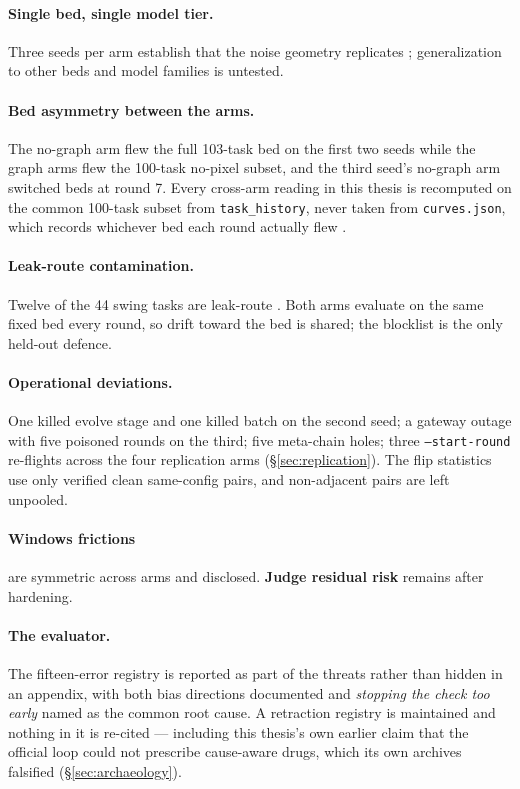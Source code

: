 \paragraph{Single bed, single model tier.} Three seeds per arm establish
that the noise geometry replicates ; generalization to other
beds and model families is untested.

\paragraph{Bed asymmetry between the arms.} The no-graph arm flew the full
103-task bed on the first two seeds while the graph arms flew the 100-task
no-pixel subset, and the third seed's no-graph arm switched beds at round 7.
Every cross-arm reading in this thesis is recomputed on the common 100-task
subset from \texttt{task\_history}, never taken from \texttt{curves.json},
which records whichever bed each round actually flew .

\paragraph{Leak-route contamination.} Twelve of the 44 swing tasks are
leak-route . Both arms evaluate on the same fixed bed every round, so
drift toward the bed is shared; the blocklist is the only held-out defence.

\paragraph{Operational deviations.} One killed evolve stage and one killed
batch on the second seed; a gateway outage with five poisoned rounds on the
third; five meta-chain holes; three \texttt{--start-round} re-flights across
the four replication arms (\S\ref{sec:replication}). The flip statistics use
only verified clean same-config pairs, and non-adjacent pairs are left
unpooled.

\paragraph{Windows frictions} are symmetric across arms and disclosed.
\textbf{Judge residual risk} remains after hardening.

\paragraph{The evaluator.} The fifteen-error registry is reported as part
of the threats rather than hidden in an appendix, with both bias directions
documented and \emph{stopping the check too early} named as the common root
cause. A retraction registry is maintained and nothing in it is re-cited
--- including this thesis's own earlier claim that the official loop could
not prescribe cause-aware drugs, which its own archives falsified
(\S\ref{sec:archaeology}).

